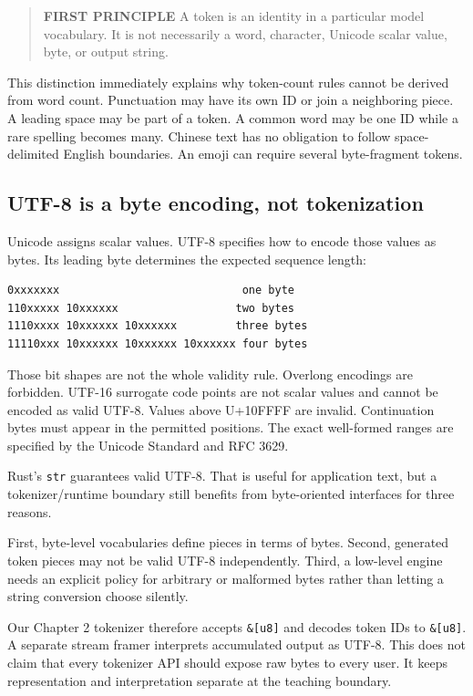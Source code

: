 \documentclass[
  10pt,
]{article}
\begin{document}
\begin{quote}
\textbf{FIRST PRINCIPLE} A token is an identity in a particular model
vocabulary. It is not necessarily a word, character, Unicode scalar
value, byte, or output string.
\end{quote}

This distinction immediately explains why token-count rules cannot be
derived from word count. Punctuation may have its own ID or join a
neighboring piece. A leading space may be part of a token. A common word
may be one ID while a rare spelling becomes many. Chinese text has no
obligation to follow space-delimited English boundaries. An emoji can
require several byte-fragment tokens.

\subsection{UTF-8 is a byte encoding, not
tokenization}\label{utf-8-is-a-byte-encoding-not-tokenization}

Unicode assigns scalar values. UTF-8 specifies how to encode those
values as bytes. Its leading byte determines the expected sequence
length:

\begin{verbatim}
0xxxxxxx                            one byte
110xxxxx 10xxxxxx                  two bytes
1110xxxx 10xxxxxx 10xxxxxx         three bytes
11110xxx 10xxxxxx 10xxxxxx 10xxxxxx four bytes
\end{verbatim}

Those bit shapes are not the whole validity rule. Overlong encodings are
forbidden. UTF-16 surrogate code points are not scalar values and cannot
be encoded as valid UTF-8. Values above U+10FFFF are invalid.
Continuation bytes must appear in the permitted positions. The exact
well-formed ranges are specified by the Unicode Standard and RFC 3629.

Rust's \texttt{str} guarantees valid UTF-8. That is useful for
application text, but a tokenizer/runtime boundary still benefits from
byte-oriented interfaces for three reasons.

First, byte-level vocabularies define pieces in terms of bytes. Second,
generated token pieces may not be valid UTF-8 independently. Third, a
low-level engine needs an explicit policy for arbitrary or malformed
bytes rather than letting a string conversion choose silently.

Our Chapter 2 tokenizer therefore accepts \texttt{\&{[}u8{]}} and
decodes token IDs to \texttt{\&{[}u8{]}}. A separate stream framer
interprets accumulated output as UTF-8. This does not claim that every
tokenizer API should expose raw bytes to every user. It keeps
representation and interpretation separate at the teaching boundary.
\end{document}
